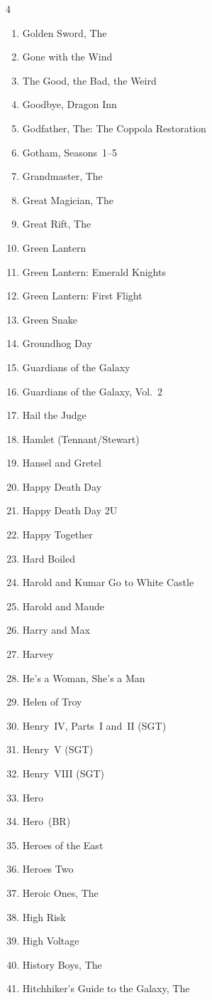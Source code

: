 \documentclass{article}
\begin{document}
\begin{multicols}{4}
\begin{enumerate}
\item Golden Sword, The
\item Gone with the Wind
\item The Good, the Bad, the Weird
\item Goodbye, Dragon Inn
\item Godfather, The: The Coppola Restoration
\item Gotham, Seasons~1--5
\item Grandmaster, The
\item Great Magician, The
\item Great Rift, The
\item Green Lantern
\item Green Lantern: Emerald Knights
\item Green Lantern: First Flight
\item Green Snake
\item Groundhog Day
\item Guardians of the Galaxy
\item Guardians of the Galaxy, Vol.~2
\item Hail the Judge
\item Hamlet (Tennant/Stewart)
\item Hansel and Gretel
\item Happy Death Day
\item Happy Death Day 2U
\item Happy Together
\item Hard Boiled
\item Harold and Kumar Go to White Castle
\item Harold and Maude
\item Harry and Max
\item Harvey
\item He's a Woman, She's a Man
\item Helen of Troy
\item Henry~IV, Parts~I and~II (SGT)
\item Henry~V (SGT)
\item Henry~VIII (SGT)
\item Hero
\item Hero~(BR)
\item Heroes of the East
\item Heroes Two
\item Heroic Ones, The
\item High Risk
\item High Voltage
\item History Boys, The
\item Hitchhiker's Guide to the Galaxy, The

\end{enumerate}
\end{multicols}
\end{document}
